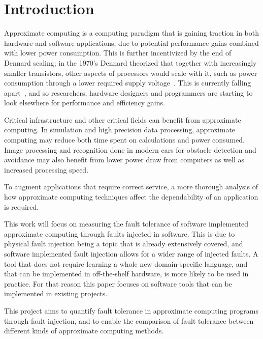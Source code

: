 \section{Introduction}


Approximate computing is a computing paradigm that is gaining traction in both hardware and software applications, due to potential performance gains combined with lower power consumption. This is further incentivized by the end of Dennard scaling; in the 1970's Dennard  theorized that together with increasingly smaller transistors, other aspects of processors would scale with it, such as power consumption through a lower required supply voltage~\citep{bohr200730}. This is currently falling apart~\citep{esmaeilzadeh2011dark}, and so researchers, hardware designers and programmers are starting to look elsewhere for performance and efficiency gains.

Critical infrastructure and other critical fields can benefit from approximate computing. In simulation and high precision data processing, approximate computing may reduce both time spent on calculations and power consumed. Image processing and recognition done in modern cars for obstacle detection and avoidance may also benefit from lower power draw from computers as well as increased processing speed.

To augment applications that require correct service, a more thorough analysis of how approximate computing techniques affect the dependability of an application is required.


This work will focus on measuring the fault tolerance of software implemented approximate computing through faults injected in software. This is due to physical fault injection being a topic that is already extensively covered, and software implemented fault injection allows for a wider range of injected faults. 
A tool that does not require learning a whole new domain-specific language, and that can be implemented in off-the-shelf hardware, is more likely to be used in practice. For that reason this paper focuses on software tools that can be implemented in existing projects.
 

This project aims to quantify fault tolerance in approximate computing programs through fault injection, and to enable the comparison of fault tolerance between different kinds of approximate computing methods.





